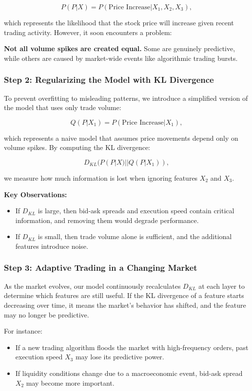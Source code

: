 \[
P(P | X) = P(\text{Price Increase} | X_1, X_2, X_3),
\]

which represents the likelihood that the stock price will increase given recent trading activity. However, it soon encounters a problem: 

\textbf{Not all volume spikes are created equal.} Some are genuinely predictive, while others are caused by market-wide events like algorithmic trading bursts.

\subsubsection*{Step 2: Regularizing the Model with KL Divergence}

To prevent overfitting to misleading patterns, we introduce a simplified version of the model that uses only trade volume:

\[
Q(P | X_1) = P(\text{Price Increase} | X_1),
\]

which represents a naive model that assumes price movements depend only on volume spikes. By computing the KL divergence:

\[
D_{KL}(P(P | X) || Q(P | X_1)),
\]

we measure how much information is lost when ignoring features \( X_2 \) and \( X_3 \).

\textbf{Key Observations:}
\begin{itemize}
    \item If \( D_{KL} \) is large, then bid-ask spreads and execution speed contain critical information, and removing them would degrade performance.
    \item If \( D_{KL} \) is small, then trade volume alone is sufficient, and the additional features introduce noise.
\end{itemize}

\subsubsection*{Step 3: Adaptive Trading in a Changing Market}

As the market evolves, our model continuously recalculates \( D_{KL} \) at each layer to determine which features are still useful. If the KL divergence of a feature starts decreasing over time, it means the market’s behavior has shifted, and the feature may no longer be predictive.

For instance:
\begin{itemize}
    \item If a new trading algorithm floods the market with high-frequency orders, past execution speed \( X_3 \) may lose its predictive power.
    \item If liquidity conditions change due to a macroeconomic event, bid-ask spread \( X_2 \) may become more important.
\end{itemize}

